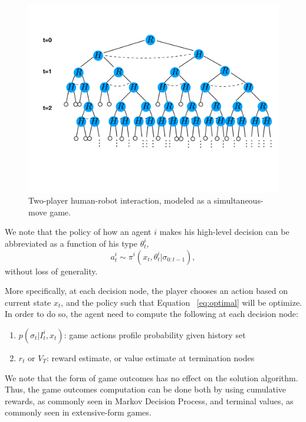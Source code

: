 \documentclass[letterpaper, 10 pt, conference]{ieeeconf}  %
\begin{document}
\begin{figure}[t]
	\centering
	\vspace{-3em}
	\includegraphics[scale=0.21]{game_tree}
	\vspace{-5em}
	\caption{Two-player human-robot interaction, modeled as a 
		simultaneous-move game. }
	\vspace{-1.4em}
	\label{fig:game_tree}
\end{figure}

We note that the policy of how an agent $i$ makes his high-level decision can be abbreviated as a function of his type $\theta^i_t$,
\begin{equation}
a^i_t \sim \pi^i(x_t,\theta^i_t|\sigma_{0:t-1}),
\end{equation}
without loss of generality.

More specifically, at each decision node, the player chooses an action based on current state $x_t$, and the policy such that Equation ~\ref{eq:optimal} will be optimize. In order to do so, the agent need to compute the following at each decision node:
\begin{enumerate}
  \item $p(\sigma_{t}|I^i_t,x_t)$: game actions profile probability given history set
  \item $r_{t}$ or $V_T$: 
    reward estimate, or value estimate at termination nodes
\end{enumerate}
We note that the form of game outcomes has no effect on the solution algorithm. Thus, the game outcomes  computation can be done both by using cumulative rewards, as commonly seen in Markov Decision Process, and terminal values, as commonly seen in extensive-form games.   
\end{document}
